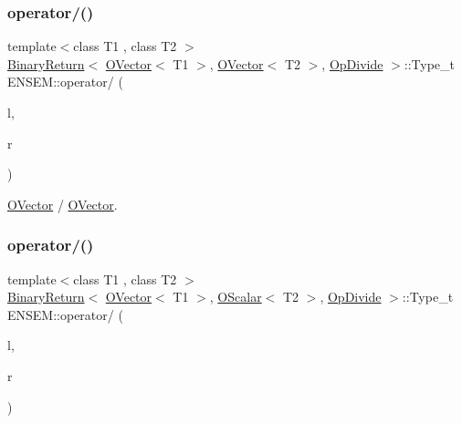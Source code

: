 \subsubsection{\texorpdfstring{operator/()}{operator/()}\hspace{0.1cm}{\footnotesize\ttfamily [1/3]}}
{\footnotesize\ttfamily template$<$class T1 , class T2 $>$ \\
\mbox{\hyperlink{structENSEM_1_1BinaryReturn}{Binary\+Return}}$<$ \mbox{\hyperlink{classENSEM_1_1OVector}{O\+Vector}}$<$ T1 $>$, \mbox{\hyperlink{classENSEM_1_1OVector}{O\+Vector}}$<$ T2 $>$, \mbox{\hyperlink{structENSEM_1_1OpDivide}{Op\+Divide}} $>$\+::Type\+\_\+t E\+N\+S\+E\+M\+::operator/ (\begin{DoxyParamCaption}\item[{const \mbox{\hyperlink{classENSEM_1_1OVector}{O\+Vector}}$<$ T1 $>$ \&}]{l,  }\item[{const \mbox{\hyperlink{classENSEM_1_1OVector}{O\+Vector}}$<$ T2 $>$ \&}]{r }\end{DoxyParamCaption})\hspace{0.3cm}{\ttfamily [inline]}}



\mbox{\hyperlink{classENSEM_1_1OVector}{O\+Vector}} / \mbox{\hyperlink{classENSEM_1_1OVector}{O\+Vector}}. 

\mbox{\label{group__obsvector_ga7000d5ea0ebcbe74abe855326d6e82cd}} 
\subsubsection{\texorpdfstring{operator/()}{operator/()}\hspace{0.1cm}{\footnotesize\ttfamily [2/3]}}
{\footnotesize\ttfamily template$<$class T1 , class T2 $>$ \\
\mbox{\hyperlink{structENSEM_1_1BinaryReturn}{Binary\+Return}}$<$ \mbox{\hyperlink{classENSEM_1_1OVector}{O\+Vector}}$<$ T1 $>$, \mbox{\hyperlink{classENSEM_1_1OScalar}{O\+Scalar}}$<$ T2 $>$, \mbox{\hyperlink{structENSEM_1_1OpDivide}{Op\+Divide}} $>$\+::Type\+\_\+t E\+N\+S\+E\+M\+::operator/ (\begin{DoxyParamCaption}\item[{const \mbox{\hyperlink{classENSEM_1_1OVector}{O\+Vector}}$<$ T1 $>$ \&}]{l,  }\item[{const \mbox{\hyperlink{classENSEM_1_1OScalar}{O\+Scalar}}$<$ T2 $>$ \&}]{r }\end{DoxyParamCaption})\hspace{0.3cm}{\ttfamily [inline]}}



